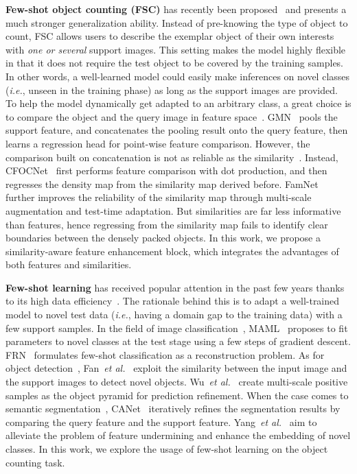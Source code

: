 \documentclass[10pt,twocolumn,letterpaper]{article}
\begin{document}
\vspace{2pt}\noindent\textbf{Few-shot object counting (FSC)}
has recently been proposed~\cite{gmn, cfocnet, famnet} and presents a much stronger generalization ability.
Instead of pre-knowing the type of object to count, FSC allows users to describe the exemplar object of their own interests with \textit{one or several} support images.
This setting makes the model highly flexible in that it does not require the test object to be covered by the training samples.
In other words, a well-learned model could easily make inferences on novel classes (\textit{i.e.}, unseen in the training phase) as long as the support images are provided.
To help the model dynamically get adapted to an arbitrary class, a great choice is to compare the object and the query image in feature space~\cite{gmn, cfocnet, famnet}.
GMN~\cite{gmn} pools the support feature, and concatenates the pooling result onto the query feature, then learns a regression head for point-wise feature comparison.
However, the comparison built on concatenation is not as reliable as the similarity~\cite{cfocnet}.
Instead, CFOCNet~\cite{cfocnet} first performs feature comparison with dot production, and then regresses the density map from the similarity map derived before.
FamNet~\cite{famnet} further improves the reliability of the similarity map through multi-scale augmentation and test-time adaptation.
But similarities are far less informative than features, hence regressing from the similarity map fails to identify clear boundaries between the densely packed objects.
In this work, we propose a similarity-aware feature enhancement block, which integrates the advantages of both features and similarities.





\vspace{2pt}\noindent\textbf{Few-shot learning} has received popular attention in the past few years thanks to its high data efficiency~\cite{maml, wertheimer2021few, fan2020few, wu2020multi, yang2021mining, zhang2019canet}.
The rationale behind this is to adapt a well-trained model to novel test data (\textit{i.e.}, having a domain gap to the training data) with a few support samples.
In the field of image classification~\cite{maml, wertheimer2021few}, MAML~\cite{maml} proposes to fit parameters to novel classes at the test stage using a few steps of gradient descent.
FRN~\cite{wertheimer2021few} formulates few-shot classification as a reconstruction problem.
As for object detection~\cite{fan2020few, wu2020multi}, Fan~\textit{et al.}~\cite{fan2020few} exploit the similarity between the input image and the support images to detect novel objects. Wu~\textit{et al.}~\cite{wu2020multi} create multi-scale positive samples as the object pyramid for prediction refinement.
When the case comes to semantic segmentation~\cite{yang2021mining, zhang2019canet}, CANet~\cite{zhang2019canet} iteratively refines the segmentation results by comparing the query feature and the support feature. Yang~\textit{et al.}~\cite{yang2021mining} aim to alleviate the problem of feature undermining and enhance the embedding of novel classes.
In this work, we explore the usage of few-shot learning on the object counting task.
\end{document}
